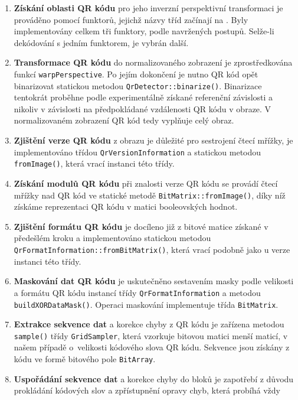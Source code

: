 \begin{enumerate}
  \item \textbf{Získání oblasti QR kódu} pro jeho inverzní perspektivní
  transformaci je prováděno pomocí funktorů, jejichž názvy tříd začínají na
  . Byly implementovány celkem tři funktory,
  podle navržených postupů. Selže-li dekódování s jedním funktorem, je vybrán další.
  \item \textbf{Transformace QR kódu} do normalizovaného zobrazení je
  zprostředkována funkcí \texttt{warpPerspective}. Po jejím dokončení je nutno
  QR kód opět binarizovat statickou metodou \texttt{QrDetector::binarize()}.
  Binarizace tentokrát proběhne podle experimentálně získané referenční závislosti a nikoliv v závislosti na předpokládané vzdálenosti QR kódu v obraze. V normalizovaném zobrazení QR kód tedy vyplňuje celý obraz.
  \item \textbf{Zjištění verze QR kódu} z obrazu je důležité pro sestrojení
  čtecí mřížky, je implementováno třídou \texttt{QrVersionInformation} a
  statickou metodou \texttt{fromImage()}, která vrací instanci této třídy.
  \item \textbf{Získání modulů QR kódu} při znalosti verze QR kódu se provádí
   čtecí mřížky nad QR kód ve statické metodě
  \texttt{BitMatrix::fromImage()}, díky níž získáme reprezentaci QR kódu v
  matici booleovských hodnot.
  \item \textbf{Zjištění formátu QR kódu} je docíleno již z bitové matice
  získané v předešlém kroku a implementováno statickou metodou
  \texttt{QrFormatInformation::fromBitMatrix()}, \linebreak[5]která vrací
  podobně jako u verze instanci této třídy.
  \item \textbf{Maskování dat QR kódu} je uskutečněno sestavením masky
  podle velikosti a formátu QR kódu instancí třídy
  \texttt{QrFormatInformation} a metodou \texttt{buildXORDataMask()}. Operaci
  maskování implementuje třída \texttt{BitMatrix}.
  \item \textbf{Extrakce sekvence dat} a korekce chyby z QR kódu je zařízena
  metodou \texttt{sample()} třídy \texttt{GridSampler}, která
  vzorkuje bitovou matici menší maticí, v našem případě o~velikosti kódového
  slova QR kódu.
  Sekvence jsou získány z kódu ve formě bitového pole \texttt{BitArray}.
  \item \textbf{Uspořádání sekvence dat} a korekce chyby do bloků je zapotřebí z
  důvodu prokládání kódových slov a zpřístupnění opravy chyb, která probíhá vždy

\end{enumerate}
